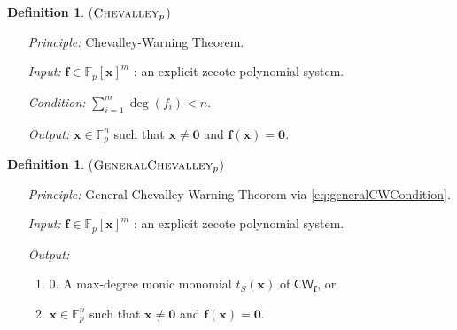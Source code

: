 \documentclass[10pt,a4paper]{article}
\theoremstyle{definition}
\newtheorem{definition}[theorem]{Definition}
\theoremstyle{remark}
\newenvironment{Enumerate}{\begin{enumerate}}{\end{enumerate}}
\newcommand{\contour}[2]{#2}
\newcommand{\bbF}{\ensuremath{\mathbb{F}}}
\renewcommand{\vec}[1]{\boldsymbol{#1}}
\newcommand{\vecf}{\ensuremath{\boldsymbol{f}}}
\newcommand{\vecx}{\ensuremath{\boldsymbol{x}}}
\newcommand{\pnum}{p}
\newcommand{\lChevalleyp}{\textsc{GeneralChevalley}_{\pnum}}
\newcommand{\eChevalleyp}{\textsc{Chevalley}_{\pnum}}
\newcommand{\CW}{\mathsf{CW}}
\begin{document}
	\noindent
	\begin{minipage}{\linewidth}
		\begin{definition}
			\label{def:explicit-chevalley} \contour{black}{($\eChevalleyp$)}\vspace{-5pt}
			\begin{itemize}[leftmargin=2.15cm,itemsep=4pt]
				\item[\slshape Principle:] Chevalley-Warning Theorem.
				\item[\slshape Input:] $\vecf \in \bbF_p[\vecx]^m$ : an explicit zecote polynomial system.
				\item[\slshape Condition:] $\sum_{i = 1}^m \deg(f_i) < n$.
				\item[\slshape Output:] $\vecx \in \bbF_p^n$ such that $\vecx \neq \vec{0}$ and $\vecf(\vecx) = \vec{0}$.
			\end{itemize}
		\end{definition}
	\end{minipage}\vspace{3mm}

\bigskip


	\noindent
	\begin{minipage}{\linewidth}
		\begin{definition}
			\label{def:general-chevalley} \contour{black}{($\lChevalleyp$)}\vspace{-5pt}
			\begin{itemize}[leftmargin=2.15cm,itemsep=4pt]
				\item[\slshape Principle:] General Chevalley-Warning Theorem via \eqref{eq:generalCWCondition}.
				\item[\slshape Input:] $\vecf \in \bbF_p[\vecx]^m$ : an explicit zecote polynomial system.
				\item[\slshape Output:] \begin{Enumerate}[leftmargin=*]
  \item[0.] A max-degree monic monomial $t_S(\vecx)$ of $\CW_{\vecf}$, or
  \item $\vecx \in \bbF_p^n$ such that $\vecx \neq \vec{0}$ and $\vecf(\vecx) = \vec{0}$.
\end{Enumerate}
			\end{itemize}
		\end{definition}
	\end{minipage}\vspace{3mm}


\bigskip
\end{document}
